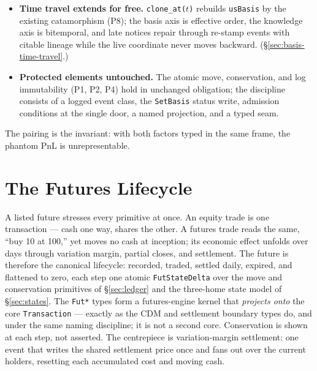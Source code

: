 \documentclass[11pt,a4paper]{article}
\begin{document}
\begin{itemize}[nosep]
(P25) admits nothing whose stamped basis the log has not committed, and the stamp is
a pure function of pinned recorded data, so real-time, batch, and multi-vendor
operation coincide and no corporate-action logic can exist outside the ledger.
(\S\ref{sec:basis-contract}.)
\item \textbf{Time travel extends for free.} \texttt{clone\_at($t$)} rebuilds
\texttt{usBasis} by the existing catamorphism (P8); the basis axis is effective order,
the knowledge axis is bitemporal, and late notices repair through re-stamp events with
citable lineage while the live coordinate never moves backward.
(\S\ref{sec:basis-time-travel}.)
\item \textbf{Protected elements untouched.} The atomic move, conservation, and log
immutability (P1, P2, P4) hold in unchanged obligation; the discipline consists of a
logged event class, the \texttt{SetBasis} status write, admission conditions at the
single door, a named projection, and a typed seam.
\end{itemize}

\noindent
The pairing is the invariant: with both factors typed in the same frame, the phantom
PnL is unrepresentable.

\section{The Futures Lifecycle}
\label{sec:futures}

\providecommand{\code}[1]{\texttt{#1}}
\providecommand{\ac}{\texttt{ac}}
\providecommand{\netq}{\mathrm{net\_qty}}
\providecommand{\unit}{u_{F}}
\providecommand{\mult}{m}

A listed future stresses every primitive at once. An equity trade is one transaction --- cash one
way, shares the other. A futures trade reads the same, ``buy 10 at 100,'' yet moves no cash at
inception; its economic effect unfolds over days through variation margin, partial closes, and
settlement. The future is therefore the canonical lifecycle: recorded, traded, settled daily,
expired, and flattened to zero, each step one atomic \code{FutStateDelta} over the move and
conservation primitives of \S\ref{sec:ledger} and the three-home state model of \S\ref{sec:states}.
The \code{Fut*} types form a futures-engine kernel that \emph{projects onto} the core
\code{Transaction} --- exactly as the CDM and settlement boundary types do, and under the same
naming discipline; it is not a second core. Conservation is shown at each step, not asserted. The centrepiece is variation-margin settlement:
one event that writes the shared settlement price once and fans out over the current holders,
resetting each accumulated cost and moving cash.
\end{document}
